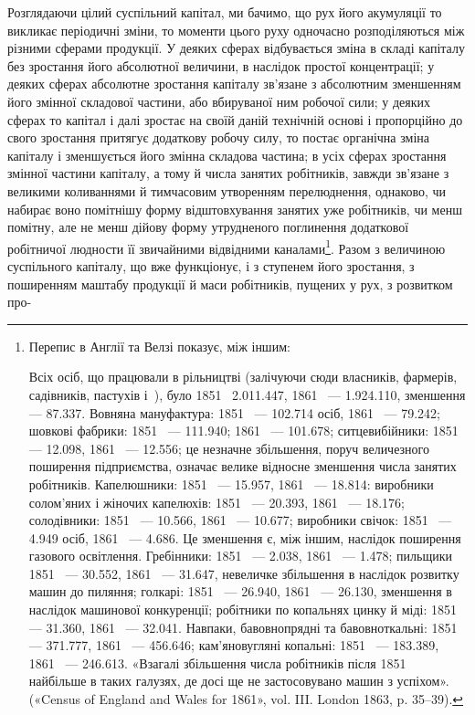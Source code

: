 Розглядаючи цілий суспільний капітал, ми бачимо, що рух
його акумуляції то викликає періодичні зміни, то моменти цього
руху одночасно розподіляються між різними сферами продукції.
У деяких сферах відбувається зміна в складі капіталу без зростання
його абсолютної величини, в наслідок простої концентрації;
у деяких сферах абсолютне зростання капіталу зв’язане з абсолютним
зменшенням його змінної складової частини, або вбируваної
ним робочої сили; у деяких сферах то капітал і далі зростає
на своїй даній технічній основі і пропорційно до свого зростання
притягує додаткову робочу силу, то постає органічна зміна капіталу
і зменшується його змінна складова частина; в усіх сферах
зростання змінної частини капіталу, а тому й числа занятих
робітників, завжди зв’язане з великими коливаннями й тимчасовим
утворенням перелюднення, однаково, чи набирає воно
помітнішу форму відштовхування занятих уже робітників, чи
менш помітну, але не менш дійову форму утрудненого поглинення
додаткової робітничої людности її звичайними відвідними каналами\footnote{
Перепис в Англії та Велзі показує, між іншим:

Всіх осіб, що працювали в рільництві (залічуючи сюди власників,
фармерів, садівників, пастухів і~), було 1851~ \num{2.011.447}, 1861~ —
\num{1.924.110}, зменшення — \num{87.337}. Вовняна мануфактура: 1851~ — \num{102.714}
осіб, 1861~ — \num{79.242}; шовкові фабрики: 1851~ — \num{111.940}; 1861~ —
\num{101.678}; ситцевибійники: 1851~ — \num{12.098}, 1861~ — \num{12.556}; це незначне
збільшення, поруч величезного поширення підприємства, означає
велике відносне зменшення числа занятих робітників. Капелюшники:
1851~ — \num{15.957}, 1861~ — \num{18.814}: виробники солом’яних і жіночих капелюхів:
1851~ — \num{20.393}, 1861~ — \num{18.176}; солодівники: 1851~ —
\num{10.566}, 1861~ — \num{10.677}; виробники свічок: 1851~ — \num{4.949} осіб, 1861~ —
\num{4.686}. Це зменшення є, між іншим, наслідок поширення газового освітлення.
Гребінники: 1851~ — \num{2.038}, 1861~ — \num{1.478}; пильщики 1851~ —
\num{30.552}, 1861~ — \num{31.647}, невеличке збільшення в наслідок розвитку
машин до пиляння; голкарі: 1851~ — \num{26.940}, 1861~ — \num{26.130}, зменшення
в наслідок машинової конкуренції; робітники по копальнях цинку й
міді: 1851~ — \num{31.360}, 1861~ — \num{32.041}. Навпаки, бавовнопрядні та бавовноткальні:
1851~ — \num{371.777}, 1861~ — \num{456.646}; кам’яновугляні копальні:
1851~ — \num{183.389}, 1861~ — \num{246.613}. «Взагалі збільшення числа робітників
після 1851~ найбільше в таких галузях, де досі ще не застосовувано
машин з успіхом». («Census of England and Wales for 1861», vol. III.
London 1863, p. 35--39).
}.
Разом з величиною суспільного капіталу, що вже функціонує,
і з ступенем його зростання, з поширенням маштабу
продукції й маси робітників, пущених у рух, з розвитком про-
\parbreak{}  %
